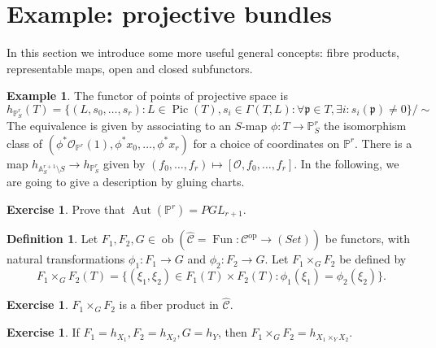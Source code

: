 \documentclass[11pt,twoside]{report}
\newcommand{\PP}{\mathbb P}
\newcommand{\OO}{\mathcal O}
\renewcommand{\to}{\rightarrow}
\newcommand{\Aaff}{\mathbb A}
\newcommand{\Pic}{\operatorname{Pic}}
\newcommand{\Aut}{\operatorname{Aut}}
\theoremstyle{plain}
\theoremstyle{definition}
\newtheorem{exa}[thm]{Example}
\newtheorem{exe}[thm]{Exercise}
\newtheorem{dfn}[thm]{Definition}
\begin{document}
\section{Example: projective bundles}
In this section we introduce some more useful general concepts: fibre products, representable maps, open and closed subfunctors.

\begin{exa} The functor of points of projective space is
 \[h_{\PP^r_S}(T)=\{(L,s_0,\ldots,s_r):L\in\Pic(T),s_i\in\Gamma(T,L):\forall \mathfrak p\in T,\exists i:s_i(\mathfrak p)\neq 0\}/\sim\]
 The equivalence is given by associating to an $S$-map $\phi\colon T\to\PP^r_S$ the isomorphism class of $(\phi^*\OO_{\PP^r}(1),\phi^*x_0,\ldots,\phi^*x_r)$ for a choice of coordinates on $\PP^r$.
 There is a map $h_{\Aaff^{r+1}_S\setminus S}\to h_{\PP^r_S}$ given by $(f_0,\ldots,f_r)\mapsto[\mathcal O,f_0,\ldots,f_r]$. In the following, we are going to give a description by gluing charts.
\end{exa}
\begin{exe}
 Prove that $\Aut(\PP^r)=PGL_{r+1}$.
\end{exe}

\begin{dfn}
 Let $F_1,F_2,G\in\operatorname{ob}(\widehat{\mathcal C}=\operatorname{Fun}\colon \mathcal C^{\text{op}}\to(Set))$ be functors, with natural transformations $\phi_1\colon F_1\to G$ and $\phi_2\colon F_2\to G$. Let $F_1\times_G F_2$ be defined by
 \[F_1\times_G F_2(T)=\{(\xi_1,\xi_2)\in F_1(T)\times F_2(T):\phi_1(\xi_1)=\phi_2(\xi_2)\}.\]
\end{dfn}

\begin{exe}
 $F_1\times_G F_2$ is a fiber product in $\widehat{\mathcal C}$.
\end{exe}

\begin{exe}
 If $F_1=h_{X_1}, F_2=h_{X_2}, G=h_Y$, then $F_1\times_G F_2=h_{X_1\times_Y X_2}$.
\end{exe}
\end{document}
